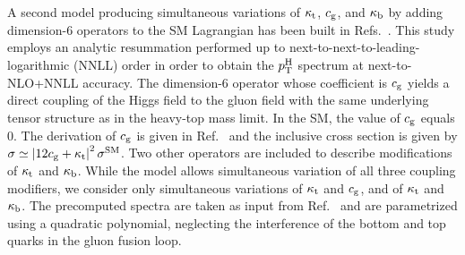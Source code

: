 A second model producing simultaneous variations of $\kappa_{\mathrm{t}}$, $c_\mathrm{g}$, and $\kappa_{\mathrm{b}}$ by adding dimension-6 operators to the SM Lagrangian has been built in Refs.~\cite{Grazzini:2017szg,Grazzini:2016paz}.
% 
This study employs an analytic resummation performed up to next-to-next-to-leading-logarithmic (NNLL) order in order to obtain the $p_\mathrm{T}^\mathrm{H}$ spectrum at next-to-NLO+NNLL accuracy.
% 
The dimension-6 operator whose coefficient is $c_\mathrm{g}$ yields a direct coupling of the Higgs field to the gluon field with the same underlying tensor structure as in the heavy-top mass limit.
% 
In the SM, the value of $c_\mathrm{g}$ equals 0.
% 
The derivation of $c_\mathrm{g}$ is given in Ref.~\cite{Grazzini:2017szg} and the inclusive cross section is given by $\sigma \simeq \left| 12c_\mathrm{g} + \kappa_{\mathrm{t}} \right|^2 \sigma^\text{SM}$.
% 
Two other operators are included to describe modifications of $\kappa_{\mathrm{t}}$ and $\kappa_{\mathrm{b}}$.
% 
While the model allows simultaneous variation of all three coupling modifiers, we consider only simultaneous variations of $\kappa_{\mathrm{t}}$ and $c_\mathrm{g}$, and of $\kappa_{\mathrm{t}}$ and $\kappa_{\mathrm{b}}$.
% 
The precomputed spectra are taken as input from Ref.~\cite{Grazzini:2017szg} and are parametrized using a quadratic polynomial, neglecting the interference of the bottom and top quarks in the gluon fusion loop.

